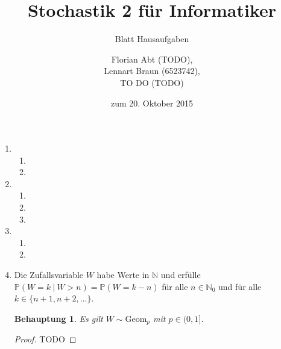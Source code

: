 \documentclass[a4paper]{scrartcl}
\title{Stochastik 2 für Informatiker}
\subtitle{Blatt \blattnr Hausaufgaben}
\author{
    Florian Abt (TODO), \\
    Lennart Braun (6523742), \\
    TO DO (TODO)
}
\date{zum 20. Oktober 2015}
\newtheorem*{behaupt}{Behauptung}
\begin{document}
\maketitle

\begin{enumerate}[label=\bfseries 1.\arabic*]
    \item
        \begin{enumerate}[label=\alph*)]
            \item

            \item

        \end{enumerate}

    \item
        \begin{enumerate}[label=\alph*)]
            \item

            \item

            \item

        \end{enumerate}

    \item
        \begin{enumerate}[label=\alph*)]
            \item

            \item

        \end{enumerate}

    \item
        Die Zufallsvariable $W$ habe Werte in $\mathbb{N}$ und erfülle
        $\mathbb{P}(W = k \ |\  W > n) = \mathbb{P}(W = k-n)$ für alle
        $n \in \mathbb{N}_0$ und für alle $k \in \{n+1, n+2, \dotsc\}$.

        \begin{behaupt}
            Es gilt $W \sim \text{Geom}_p$ mit $p \in (0,1]$.
        \end{behaupt}
        \begin{proof}
            TODO
        \end{proof}

\end{enumerate}
\end{document}

